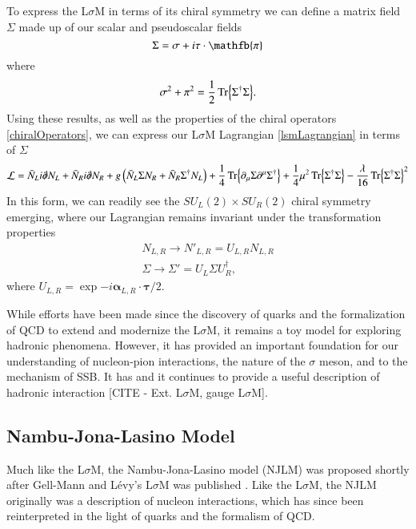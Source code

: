 \documentclass[aps,prd,onecolumn,showpacs,amsmath,amssymb,nofootinbib, 11pt]{revtex4} \pdfoutput=1
\newcommand{\lsm}{L$\sigma$M}
\begin{document}
To express the {\lsm} in terms of its chiral symmetry we can define a matrix field $\Sigma$ made up of our scalar and pseudoscalar fields
\begin{equation}
    \Sigma = \sigma + i \tau \cdot \mathfb{\pi}
\end{equation}
where
\begin{equation}
    \sigma^{2} + \pi^{2} = \frac{1}{2}\Tr{\Sigma^{\dagger}\Sigma}.
\end{equation}
Using these results, as well as the properties of the chiral operators \eqref{chiralOperators}, we can express our {\lsm} Lagrangian \eqref{lsmLagrangian} in terms of $\Sigma$
\begin{equation}\label{lsmLagrangianMatrixForm}
\mathcal{L} = \bar{N}_{L}i \slashed{\partial}N_{L} + \bar{N}_{R}i \slashed{\partial}N_{R} + g\left( \bar{N}_{L}\Sigma N_{R} + \bar{N}_{R}\Sigma^{\dagger} N_{L} \right) + \frac{1}{4}\Tr{\partial_{\mu}\Sigma\partial^{\mu}\Sigma^{\dagger}} + \frac{1}{4} \mu^{2} \Tr{\Sigma^{\dagger}\Sigma} - \frac{\lambda}{16}\Tr{\Sigma^{\dagger}\Sigma}^{2}
\end{equation}
In this form, we can readily see the ${S\!U}_L(2)\times {S\!U}_R(2)$ chiral symmetry emerging, where our Lagrangian remains invariant under the transformation properties
\begin{gather}\label{su2Symmetries}
    N_{L,R} \rightarrow {N'}_{L,R} = U_{L,R} N_{L,R}\\
    \Sigma \rightarrow {\Sigma'} = U_{L}\Sigma U^{\dagger}_{R},
\end{gather}
where $U_{L,R} = \exp{-i \mathbf{\alpha}_{L,R}\cdot\mathbf{\tau}/2}$.

While efforts have been made since the discovery of quarks and the formalization of QCD to extend and modernize the \lsm, it remains a toy model for exploring hadronic phenomena. However, it has provided an important foundation for our understanding of nucleon-pion interactions, the nature of the $\sigma$ meson, and to the mechanism of SSB. It has and it continues to provide a useful description of hadronic interaction [CITE - Ext. \lsm, gauge \lsm].
\subsection{Nambu-Jona-Lasino Model}
Much like the \lsm, the Nambu-Jona-Lasino model (NJLM) was proposed shortly after Gell-Mann and L\'evy's {\lsm} was published \cite{NJL1, NJL2}. Like the {\lsm}, the NJLM originally was a description of nucleon interactions, which has since been reinterpreted in the light of quarks and the formalism of QCD.
\end{document}
